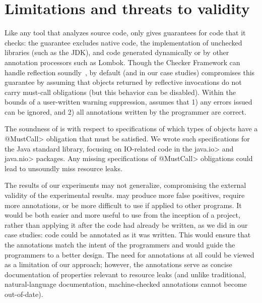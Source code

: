 \section{Limitations and threats to validity}
\label{sec:threats}

Like any tool that analyzes source code, \tool only
gives guarantees for code that it checks: the guarantee
excludes native code, the implementation of unchecked libraries (such as the JDK),
and code generated dynamically or by other annotation processors
such as Lombok.
Though
the Checker Framework can handle 
reflection soundly~\cite{BarrosJMVDdAE2015}, by default (and in our case studies)
\tool compromises this guarantee
by assuming that objects returned by reflective invocations
do not carry must-call obligations (but this behavior can
be disabled).
Within the bounds
of a user-written warning suppression, \tool assumes that 1)
any errors issued can be ignored, and 2) all annotations
written by the programmer are correct.

 The soundness of
\tool is with respect to specifications of which types of objects have a
\<@MustCall> obligation that must be satisfied.  We wrote such specifications
for the Java standard library, focusing on IO-related code in the \<java.io> and
\<java.nio> packages.  Any missing specifications of \<@MustCall> obligations
could lead \tool to unsoundly miss resource leaks.

The results of our experiments may not generalize, compromising the
external validity of the experimental results.
\Tool may produce more false positives, require
more annotations, or be more difficult to use if applied to other
programs.  It would be both easier and more useful to use \tool from
the inception of a project, rather than applying it after the code had
already be written, as we did in our case studies: code could be
annotated as it was written.  This would ensure that the annotations match
the intent of the programmers and would guide the programmers to a better design.
The need for annotations at all could be viewed as a limitation of our approach;
however, the annotations serve as concise documentation of
properties relevant to resource leaks (and unlike traditional, natural-language
documentation, machine-checked annotations cannot become out-of-date).

